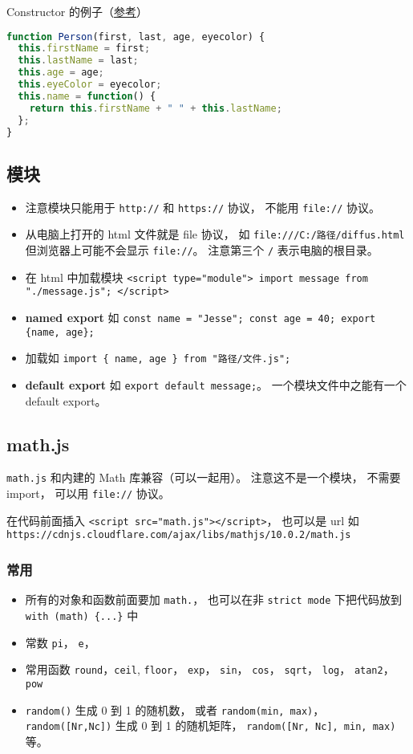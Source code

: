 Constructor 的例子（\href{https://www.w3schools.com/js/js_object_constructors.asp}{参考}）
\begin{lstlisting}[language=js]
function Person(first, last, age, eyecolor) {
  this.firstName = first;
  this.lastName = last;
  this.age = age;
  this.eyeColor = eyecolor;
  this.name = function() {
    return this.firstName + " " + this.lastName;
  };
}
\end{lstlisting}

\subsection{模块}
\begin{itemize}
\item 注意模块只能用于 \verb|http://| 和 \verb|https://| 协议， 不能用 \verb|file://| 协议。
\item 从电脑上打开的 html 文件就是 file 协议， 如 \verb|file:///C:/路径/diffus.html| 但浏览器上可能不会显示 \verb|file://|。 注意第三个 \verb|/| 表示电脑的根目录。
\item 在 html 中加载模块 \verb|<script type="module"> import message from "./message.js"; </script>|
\item \textbf{named export} 如 \verb|const name = "Jesse"; const age = 40; export {name, age};|
\item 加载如 \verb|import { name, age } from "路径/文件.js";|
\item \textbf{default export} 如 \verb|export default message;|。 一个模块文件中之能有一个 default export。
\end{itemize}


\subsection{math.js}
\verb|math.js| 和内建的 Math 库兼容（可以一起用）。 注意这不是一个模块， 不需要 import， 可以用 \verb|file://| 协议。

在代码前面插入 \verb|<script src="math.js"></script>|， 也可以是 url 如 \verb|https://cdnjs.cloudflare.com/ajax/libs/mathjs/10.0.2/math.js|

\subsubsection{常用}
\begin{itemize}
\item 所有的对象和函数前面要加 \verb|math.|， 也可以在非 \verb|strict mode| 下把代码放到 \verb|with (math) {...}| 中
\item 常数 \verb|pi|， \verb|e|， 
\item 常用函数 \verb|round|，\verb|ceil|, \verb|floor|， \verb|exp|， \verb|sin|， \verb|cos|， \verb|sqrt|， \verb|log|， \verb|atan2|， \verb|pow|
\item \verb|random()| 生成 0 到 1 的随机数， 或者 \verb|random(min, max)|， \verb|random([Nr,Nc])| 生成 0 到 1 的随机矩阵， \verb|random([Nr, Nc], min, max)| 等。
\end{itemize}

